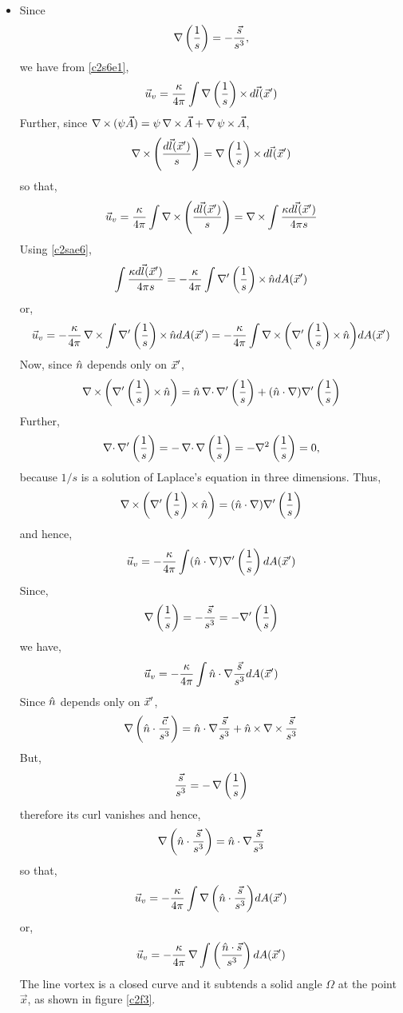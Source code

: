 \begin{itemize}
\item Since
\[
\operatorname{\nabla}{\left(\frac{1}{s}\right)} = -\frac{\vec{s}}{s^3},
\]
we have from \eqref{c2s6e1},
\[
\vec{u}_v = \frac{\kappa}{4\pi}\int \operatorname{\nabla}{\left(\frac{1}{s}\right)} \operatorname{\times} d\vec{l}(\vec{x}^\prime)
\]
Further, since $\operatorname{\nabla\operatorname{\times}}{(\psi\vec{A})} = \psi\operatorname{\nabla\operatorname{\times}}{\vec{A}} + \operatorname{\nabla}{\psi}\operatorname{\times}\vec{A}$,
\[
\operatorname{\nabla\operatorname{\times}}{\left(\frac{d\vec{l}(\vec{x}^\prime)}{s}\right)} = \operatorname{\nabla}{\left(\frac{1}{s}\right)} \operatorname{\times} d\vec{l}(\vec{x}^\prime)
\]
so that,
\[
\vec{u}_v = \frac{\kappa}{4\pi} \int \operatorname{\nabla\operatorname{\times}}{\left(\frac{d\vec{l}(\vec{x}^\prime)}{s}\right)} = \operatorname{\nabla\operatorname{\times}}\int \frac{\kappa d\vec{l}(\vec{x}^\prime)}{4\pi s}
\]
Using \eqref{c2sae6},
\[
\int \frac{\kappa d\vec{l}(\vec{x}^\prime)}{4\pi s} = -\frac{\kappa}{4\pi}\int\nabla^\prime\left(\frac{1}{s}\right)\operatorname{\times}\hat{n} dA(\vec{x}^\prime)
\]
or,
\[
\vec{u}_v = -\frac{\kappa}{4\pi} \operatorname{\nabla\operatorname{\times}} \int\nabla^\prime\left(\frac{1}{s}\right)\operatorname{\times}\hat{n} dA(\vec{x}^\prime) = 
-\frac{\kappa}{4\pi}\int\operatorname{\nabla\operatorname{\times}}{\left(\nabla^\prime\left(\frac{1}{s}\right)\operatorname{\times}\hat{n}\right)} dA(\vec{x}^\prime)
\]
Now, since $\hat{n}$ depends only on $\vec{x}^\prime$,
\[
\operatorname{\nabla\operatorname{\times}}{\left(\nabla^\prime\left(\frac{1}{s}\right)\operatorname{\times}\hat{n}\right)} = \hat{n}\operatorname{\nabla\cdot}{\nabla^\prime\left(\frac{1}{s}\right)} + (\hat{n}\cdot\nabla)\nabla^\prime\left(\frac{1}{s}\right)
\]
Further,
\[
\operatorname{\nabla\cdot}{\nabla^\prime\left(\frac{1}{s}\right)} = -\operatorname{\nabla\cdot}{\operatorname{\nabla}{\left(\frac{1}{s}\right)}} = -\nabla^2\left(\frac{1}{s}\right) = 0,
\]
because $1/s$ is a solution of Laplace's equation in three dimensions. Thus,
\[
\operatorname{\nabla\operatorname{\times}}{\left(\nabla^\prime\left(\frac{1}{s}\right)\operatorname{\times}\hat{n}\right)} = (\hat{n}\cdot\nabla)\nabla^\prime\left(\frac{1}{s}\right)
\]
and hence,
\[
\vec{u}_v = -\frac{\kappa}{4\pi} \int (\hat{n}\cdot\nabla)\nabla^\prime\left(\frac{1}{s}\right)dA(\vec{x}^\prime)
\]
Since,
\[
\operatorname{\nabla}{\left(\frac{1}{s}\right)} = -\frac{\vec{s}}{s^3} = -\nabla^\prime\left(\frac{1}{s}\right)
\]
we have,
\[
\vec{u}_v = -\frac{\kappa}{4\pi} \int \hat{n} \cdot \nabla \frac{\vec{s}}{s^3} dA(\vec{x}^\prime)
\]
Since $\hat{n}$ depends only on $\vec{x}^\prime$,
\[
\operatorname{\nabla}{\left(\hat{n}\cdot\frac{\vec{c}}{s^3}\right)} = \hat{n} \cdot \nabla \frac{\vec{s}}{s^3} + \hat{n} \operatorname{\times} \operatorname{\nabla\operatorname{\times}}{\frac{\vec{s}}{s^3}}
\]
But,
\[
\frac{\vec{s}}{s^3} = -\operatorname{\nabla}{\left(\frac{1}{s}\right)}
\]
therefore its curl vanishes and hence,
\[
\operatorname{\nabla}{\left(\hat{n}\cdot\frac{\vec{s}}{s^3}\right)} = \hat{n} \cdot \nabla \frac{\vec{s}}{s^3}
\]
so that,
\[
\vec{u}_v = -\frac{\kappa}{4\pi} \int \operatorname{\nabla}{\left(\hat{n}\cdot\frac{\vec{s}}{s^3}\right)} dA(\vec{x}^\prime)
\]
or,
\[
\vec{u}_v = -\frac{\kappa}{4\pi} \operatorname{\nabla}{\int \left(\frac{\hat{n}\cdot\vec{s}}{s^3}\right) dA(\vec{x}^\prime)}
\]
The line vortex is a closed curve and it subtends a solid angle $\Omega$ at the point $\vec{x}$, as shown in figure \ref{c2f3}.
\begin{figure}[!ht]

\end{figure}
\end{itemize}
